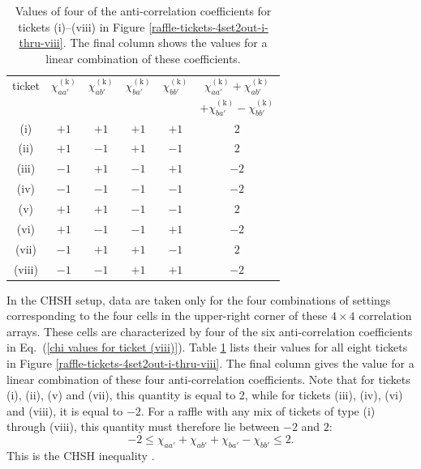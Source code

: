  \begin{table}[h]
\centering
\begin{tabular}{|c||c|c|c|c||c|}
\hline
ticket & \quad $\chi_{aa'}^{\mathrm{(k)}}$ \quad & \quad $\chi_{ab'}^{\mathrm{(k)}}$ \quad & \quad $\chi_{ba'}^{\mathrm{(k)}}$ \quad & \quad $\chi_{bb'}^{\mathrm{(k)}}$ \quad &  $\chi_{aa'}^{\mathrm{(k)}} +\chi_{ab'}^{\mathrm{(k)}}$ \quad \\[.1cm] 
 &  &  &  &  &  \quad $+\chi_{ba'}^{\mathrm{(k)}} - \chi_{bb'}^{\mathrm{(k)}}$ \quad \\[.1cm]
\hline
 (i) & $+1$ & $+1$ & $+1$ & $+1$ & $2$ \\[.1cm]
 (ii) & $+1$ & $-1$ & $+1$ & $-1$ & $2$ \\[.1cm]
 (iii) & $-1$ & $+1$ & $-1$ & $+1$ & $-2$ \\[.1cm]
(iv) & $-1$ & $-1$ & $-1$ & $-1$ & $-2$ \\[.1cm]
 (v) & $+1$ & $+1$ & $-1$ & $-1$ & $2$ \\[.1cm]
 (vi) & $+1$ & $-1$ & $-1$ & $+1$ & $-2$ \\[.1cm]
 (vii) & $-1$ & $+1$ & $+1$ & $-1$ & $2$ \\[.1cm]
(viii) & $-1$ & $-1$ & $+1$ & $+1$ & $-2$ \\[.1cm]
 \hline
\end{tabular}
\caption{Values of four of the anti-correlation coefficients for tickets (i)--(viii) in Figure \ref{raffle-tickets-4set2out-i-thru-viii}. The final column shows the values for a linear combination of these coefficients.}
\label{values of chi-4set2out}
\end{table}

In the CHSH setup, data are taken only for the four combinations of settings corresponding to the four cells in the upper-right corner of these $4 \times 4$ correlation arrays. These cells are characterized by four of the six anti-correlation coefficients in Eq.\ (\ref{chi values for ticket (viii)}). Table \ref{values of chi-4set2out} lists their values for all eight tickets in Figure \ref{raffle-tickets-4set2out-i-thru-viii}. The final column gives the value for a linear combination of these four anti-correlation coefficients. Note that for tickets (i), (ii), (v) and (vii), this quantity is equal to 2, while for tickets (iii), (iv), (vi) and (viii), it is equal to $-2$. For a raffle with any mix of tickets of type (i) through (viii), this quantity must therefore lie between $-2$ and $2$:
\begin{equation}
-2 \le \chi_{aa'} + \chi_{ab'} + \chi_{ba'} - \chi_{bb'} \le 2.
\label{CHSH inequality}
\end{equation}
This is the CHSH inequality \citep[p.\ 68]{Bub 2016}.

